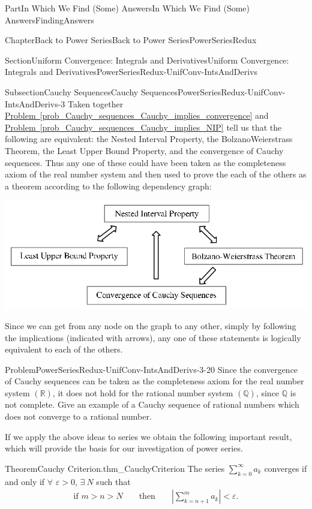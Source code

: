 \documentclass[oneside,10pt,]{book}
\newcommand{\xreffont}{\relax}
\numberwithin{equation}{part}
\newcommand{\abs}[1]{\left|#1\right|}
\newcommand{\eps}{\varepsilon}
\newcommand{\RR}{\mathbb {R}}
\newcommand{\QQ}{\mathbb {Q}}
\newcommand{\lt}{<}
\newcommand{\gt}{>}
\newcommand{\amp}{&}
\begin{document}
\begin{partptx}{Part}{In Which We Find (Some) Answers}{}{In Which We Find (Some) Answers}{}{}{FindingAnswers}
\begin{chapterptx}{Chapter}{Back to Power Series}{}{Back to Power Series}{}{}{PowerSeriesRedux}
\begin{sectionptx}{Section}{Uniform Convergence: Integrals and Derivatives}{}{Uniform Convergence: Integrals and Derivatives}{}{}{PowerSeriesRedux-UnifConv-IntsAndDerivs}
\begin{subsectionptx}{Subsection}{Cauchy Sequences}{}{Cauchy Sequences}{}{}{PowerSeriesRedux-UnifConv-IntsAndDerivs-3}
Taken together \hyperref[prob_Cauchy_sequences_Cauchy_implies_convergence]{Problem~{\xreffont\ref{prob_Cauchy_sequences_Cauchy_implies_convergence}}} and \hyperref[prob_Cauchy_sequences_Cauchy_implies_NIP]{Problem~{\xreffont\ref{prob_Cauchy_sequences_Cauchy_implies_NIP}}} tell us that the following are equivalent: the Nested Interval Property, the Bolzano\textendash{}Weierstrass Theorem, the Least Upper Bound Property, and the convergence of Cauchy sequences. Thus any one of these could have been taken as the completeness axiom of the real number system and then used to prove the each of the others as a theorem according to the following dependency graph:%
\begin{image}{0}{1}{0}{}%
\includegraphics[width=\linewidth]{external/images/CompletenessAxioms.png}
\end{image}%
Since we can get from any node on the graph to any other, simply by following the implications (indicated with arrows), any one of these statements is logically equivalent to each of the others.%
\begin{problem}{Problem}{}{PowerSeriesRedux-UnifConv-IntsAndDerivs-3-20}%
Since the convergence of Cauchy sequences can be taken as the completeness axiom for the real number system \((\RR)\), it does not hold for the rational number system \((\QQ)\), since \(\QQ{}\) is not complete. Give an example of a Cauchy sequence of rational numbers which does not converge to a rational number.%
\end{problem}
If we apply the above ideas to series we obtain the following important result, which will provide the basis for our investigation of power series.%
\begin{theorem}{Theorem}{Cauchy Criterion.}{}{thm_CauchyCriterion}%
%
The series \(\sum_{k=0}^\infty a_k\) converges if and only if \(\forall\) \(\eps>0\), \(\exists\ N\) such that%
\begin{align*}
\text{if } m\gt{}n\gt{}N\amp{}\amp{}\text{ then }\amp{}\amp{} \abs{\sum_{k=n+1}^ma_k}\lt
\eps.
\end{align*}

\end{theorem}
\end{subsectionptx}
\end{sectionptx}
\end{chapterptx}
\end{partptx}
\end{document}
